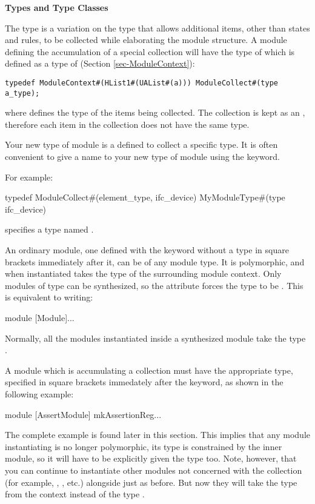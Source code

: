 {\bf Types and Type Classes}

The  type is a variation  on the  type
that allows additional items, other than states and rules,  to be collected
while  elaborating the module structure.    A module defining the
accumulation of a special collection will have the type of
  which is defined as a type of 
(Section \ref{sec-ModuleContext}):  

\begin{verbatim}
typedef ModuleContext#(HList1#(UAList#(a))) ModuleCollect#(type a_type);
\end{verbatim}



where   defines the type of 
the items being collected.   The collection is kept as an
,  therefore each item in the  collection does not  have the
same type.  %

Your new type of module is a  defined to collect a
specific type.  It is often convenient to give a name to your new type
of module using the  keyword.

For example:
\begin{libverbatim}
     typedef ModuleCollect#(element_type, ifc_device)
             MyModuleType#(type ifc_device)
\end{libverbatim}

specifies a type named .

An ordinary module, one defined with the keyword  without
a type in square brackets immediately after it, can be of any module
type.  It is polymorphic, and when  instantiated  takes the
type of the surrounding module context.   Only modules of type
 can be synthesized, so the  
attribute forces the type to be .  This is equivalent to
writing:
\begin{libverbatim}
    module [Module]...
\end{libverbatim}
Normally, all the modules instantiated inside a synthesized module take
the type .

A module which is accumulating a collection must have the appropriate
type, specified in square brackets immedately after the keyword, as
shown in the following example:
\begin{libverbatim}
    module [AssertModule] mkAssertionReg...
\end{libverbatim}
The complete example is found later in this section.
This implies that any module instantiating  is no
longer polymorphic, its type is constrained by the inner module, so it
will have to be explicitly given the  type too. Note,
however, that you can continue to instantiate other modules not
concerned with the collection (for example, , ,
etc.) alongside  just as before.  But now they will
take the type  from the context instead of the type
.  

